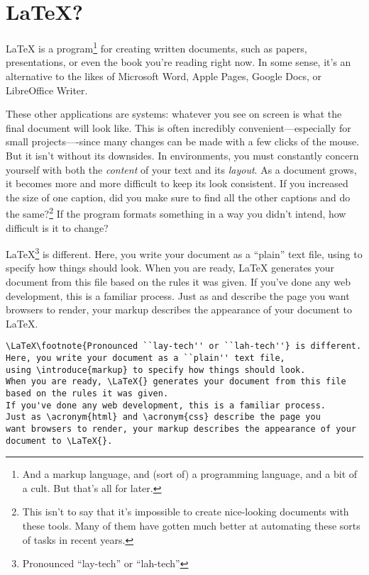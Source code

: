 \chapter{\texorpdfstring{\LaTeX}{LaTeX}?}

\LaTeX{} is a program\footnote{And a markup language,
and (sort of) a programming language, and a bit of a cult.
But that's all for later.}
for creating written documents, such as papers, presentations,
or even the book you're reading right now.
In some sense, it's an alternative to the likes of Microsoft Word,
Apple Pages, Google Docs, or LibreOffice Writer.

These other applications are
  systems: whatever
you see on screen is what the final document will look like.
This is often incredibly convenient---especially for small projects----since
many changes can be made with a few clicks of the mouse.
But it isn't without its downsides.
In  environments,
you must constantly concern yourself with both
the \emph{content} of your text and its \emph{layout}.
As a document grows, it becomes more and more difficult to keep its look consistent.
If you increased the size of one caption,
did you make sure to find all the other captions and do the
same?\footnote{This isn't to say that it's impossible
to create nice-looking documents with these tools.
Many of them have gotten much better at automating these sorts of
tasks in recent years.}
If the program formats something in a way you didn't intend,
how difficult is it to change?%

\LaTeX\footnote{Pronounced ``lay-tech'' or ``lah-tech''} is different.
Here, you write your document as a ``plain'' text file,
using  to specify how things should look.
When you are ready, \LaTeX{} generates your document from this file
based on the rules it was given.
If you've done any web development, this is a familiar process.
Just as  and  describe the page you
want browsers to render, your markup describes the appearance of your
document to \LaTeX{}.

\begin{leftfigure}
\begin{lstlisting}
\LaTeX\footnote{Pronounced ``lay-tech'' or ``lah-tech''} is different.
Here, you write your document as a ``plain'' text file,
using \introduce{markup} to specify how things should look.
When you are ready, \LaTeX{} generates your document from this file
based on the rules it was given.
If you've done any web development, this is a familiar process.
Just as \acronym{html} and \acronym{css} describe the page you
want browsers to render, your markup describes the appearance of your
document to \LaTeX{}.
\end{lstlisting}
\end{leftfigure}

